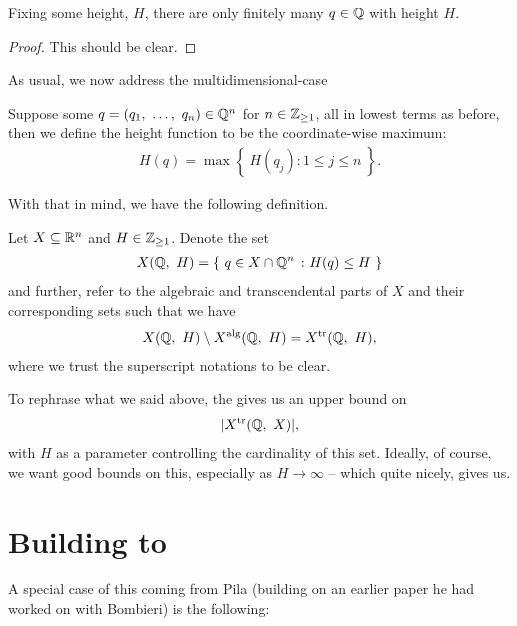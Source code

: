 \begin{corollary}
  Fixing some height, $H$, there are only finitely many $q \in \Q$ with height $H$.
\end{corollary}
\begin{proof}
  This should be clear.
\end{proof}

As usual, we now address the multidimensional-case
\begin{definition}
  Suppose some $q = (\vonevm{q}{n}) \in \Q^n$ for $n \in \Zgeq{1}$, all in lowest terms as before, then we define the height function to be the coordinate-wise maximum:
    \begin{align*}
      H(q) = \max{ \left\{ \ H(q_j) \colon 1 \leq j \leq n \ \right\} }.
    \end{align*}
  \label{defn:Qn_height}
\end{definition}

With that in mind, we have the following definition.
\begin{definition}
  Let $\XRn[X]{n}$ and $H \in \Zgeq{1}$. Denote the set
    \begin{align*}
      \XQH[H] = \left\{ \ q \in X \cap \Q^n \ \colon H(q) \leq H \ \right\}
    \end{align*}
    and further, refer to the algebraic and transcendental parts of $X$ and their corresponding sets such that we have
    \begin{align*}
      \XQH[H] \setminus \XalgQH[H] = \XtrQH[H],
    \end{align*}
    where we trust the superscript notations to be clear.
  \label{defn:height_sets}
\end{definition}

To rephrase what we said above, the \pwt gives us an upper bound on
  \begin{align*}
    \card{\XtrQH[X]},
  \end{align*}
  with $H$ as a parameter controlling the cardinality of this set. Ideally, of course, we want good bounds on this, especially as $H \to \infty$ -- which quite nicely, \pw gives us.

\section{Building to \pw}

A special case of this coming from Pila (building on an earlier paper he had worked on with Bombieri) is the following:

